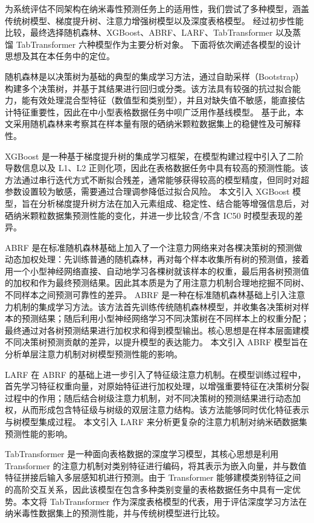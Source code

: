 为系统评估不同架构在纳米毒性预测任务上的适用性，我们尝试了多种模型，涵盖传统树模型、梯度提升树、注意力增强树模型以及深度表格模型。
经过初步性能比较，最终选择随机森林、XGBoost、ABRF、LARF、TabTransformer 以及蒸馏 TabTransformer 六种模型作为主要分析对象。
下面将依次阐述各模型的设计思想及其在本任务中的定位。

随机森林是以决策树为基础的典型的集成学习方法，通过自助采样（Bootstrap）构建多个决策树，并基于其结果进行回归或分类。该方法具有较强的抗过拟合能力，能有效处理混合型特征（数值型和类别型），并且对缺失值不敏感，能直接估计特征重要性，因此在中小型表格数据任务中呗广泛用作基线模型。
基于此，本文采用随机森林来考察其在样本量有限的硒纳米颗粒数据集上的稳健性及可解释性。


XGBoost 是一种基于梯度提升树的集成学习框架，在模型构建过程中引入了二阶导数信息以及 L1、L2 正则化项，因此在表格数据任务中具有较高的预测性能。该方法通过串行迭代方式不断拟合残差，通常能够获得较高的模型精度，但同时对超参数设置较为敏感，需要通过合理调参降低过拟合风险。
本文引入 XGBoost 模型，旨在分析梯度提升树方法在加入元素组成、稳定性、结合能等增强信息后，对硒纳米颗粒数据集预测性能的变化，并进一步比较含/不含 IC50 时模型表现的差异。

ABRF 是在标准随机森林基础上加入了一个注意力网络来对各棵决策树的预测做动态加权处理：先训练普通的随机森林，再对每个样本收集所有树的预测值，接着用一个小型神经网络直接、自动地学习各棵树就该样本的权重，最后用各树预测值的加权和作为最终预测结果。因此其本质是为了用注意力机制合理地挖掘不同树、不同样本之间预测可靠性的差异。
ABRF 是一种在标准随机森林基础上引入注意力机制的集成学习方法。该方法首先训练传统随机森林模型，并收集各决策树对样本的预测结果；随后利用小型神经网络学习不同决策树在不同样本上的权重分配；最终通过对各树预测结果进行加权求和得到模型输出。核心思想是在样本层面建模不同决策树预测贡献的差异，以提升模型的表达能力。
本文引入 ABRF 模型旨在分析单层注意力机制对树模型预测性能的影响。


LARF 在 ABRF 的基础上进一步引入了特征级注意力机制。在模型训练过程中，首先学习特征权重向量，对原始特征进行加权处理，以增强重要特征在决策树分裂过程中的作用；随后结合树级注意力机制，对不同决策树的预测结果进行动态加权，从而形成包含特征级与树级的双层注意力结构。该方法能够同时优化特征表示与树模型集成过程。
本文引入 LARF 来分析更复杂的注意力机制对纳米硒数据集预测性能的影响。

TabTransformer 是一种面向表格数据的深度学习模型，其核心思想是利用 Transformer 的注意力机制对类别特征进行编码，将其表示为嵌入向量，并与数值特征拼接后输入多层感知机进行预测。由于 Transformer 能够建模类别特征之间的高阶交互关系，因此该模型在包含多种类别变量的表格数据任务中具有一定优势。本文将 TabTransformer 作为深度表格模型的代表，用于评估深度学习方法在纳米毒性数据集上的预测性能，并与传统树模型进行比较。

